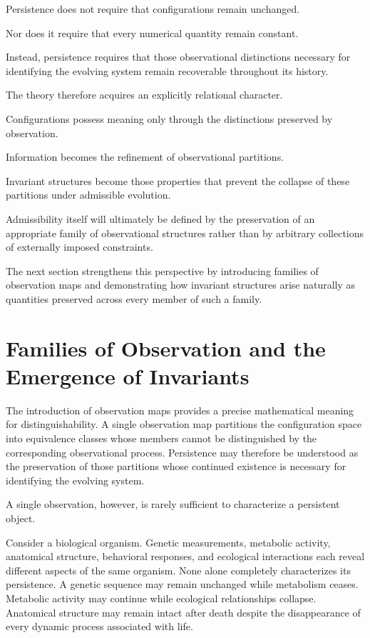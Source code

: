 \documentclass[11pt]{book}
\numberwithin{equation}{chapter}
\theoremstyle{definition}
\theoremstyle{plain}
\begin{document}
Persistence does not require that configurations remain unchanged.

Nor does it require that every numerical quantity remain constant.

Instead, persistence requires that those observational distinctions necessary for identifying the evolving system remain recoverable throughout its history.

The theory therefore acquires an explicitly relational character.

Configurations possess meaning only through the distinctions preserved by observation.

Information becomes the refinement of observational partitions.

Invariant structures become those properties that prevent the collapse of these partitions under admissible evolution.

Admissibility itself will ultimately be defined by the preservation of an appropriate family of observational structures rather than by arbitrary collections of externally imposed constraints.

The next section strengthens this perspective by introducing families of observation maps and demonstrating how invariant structures arise naturally as quantities preserved across every member of such a family.

\section{Families of Observation and the Emergence of Invariants}

The introduction of observation maps provides a precise mathematical meaning for distinguishability. A single observation map partitions the configuration space into equivalence classes whose members cannot be distinguished by the corresponding observational process. Persistence may therefore be understood as the preservation of those partitions whose continued existence is necessary for identifying the evolving system.

A single observation, however, is rarely sufficient to characterize a persistent object.

Consider a biological organism. Genetic measurements, metabolic activity, anatomical structure, behavioral responses, and ecological interactions each reveal different aspects of the same organism. None alone completely characterizes its persistence. A genetic sequence may remain unchanged while metabolism ceases. Metabolic activity may continue while ecological relationships collapse. Anatomical structure may remain intact after death despite the disappearance of every dynamic process associated with life.
\end{document}
